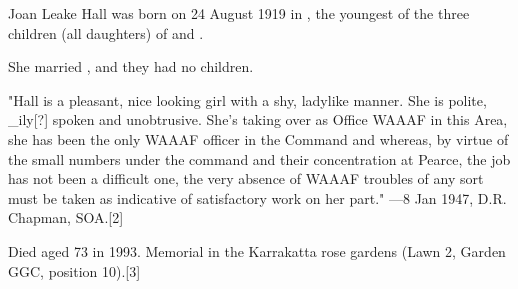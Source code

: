 
Joan Leake Hall was born on 24 August 1919 in ,\cite{JLHbirth}
the youngest of the three children (all daughters)
of  and .

She married , and they had no children.

"Hall is a pleasant, nice looking girl with a shy, ladylike manner.
She is polite, _ily[?] spoken and unobtrusive.
She's taking over as Office WAAAF in this Area, she has been the only WAAAF officer in the Command and whereas,
by virtue of the small numbers under the command and their concentration at Pearce,
the job has not been a difficult one, the very absence of WAAAF troubles of any sort must be taken as indicative
of satisfactory work on her part." —8 Jan 1947, D.R. Chapman, SOA.[2]

Died aged 73 in 1993. Memorial in the Karrakatta rose gardens (Lawn 2, Garden GGC, position 10).[3]
